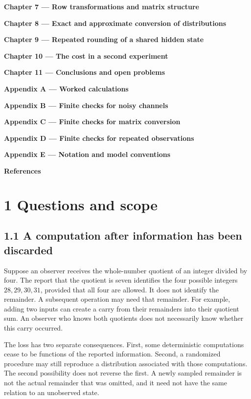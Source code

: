 \documentclass[
]{article}
\begin{document}
\textbf{Chapter 7 --- Row transformations and matrix structure}

\textbf{Chapter 8 --- Exact and approximate conversion of distributions}

\textbf{Chapter 9 --- Repeated rounding of a shared hidden state}

\textbf{Chapter 10 --- The cost in a second experiment}

\textbf{Chapter 11 --- Conclusions and open problems}

\textbf{Appendix A --- Worked calculations}

\textbf{Appendix B --- Finite checks for noisy channels}

\textbf{Appendix C --- Finite checks for matrix conversion}

\textbf{Appendix D --- Finite checks for repeated observations}

\textbf{Appendix E --- Notation and model conventions}

\textbf{References}

\section{1 Questions and scope}\label{questions-and-scope}

\subsection{1.1 A computation after information has been
discarded}\label{a-computation-after-information-has-been-discarded}

Suppose an observer receives the whole-number quotient of an integer
divided by four. The report that the quotient is seven identifies the
four possible integers \(28,29,30,31\), provided that all four are
allowed. It does not identify the remainder. A subsequent operation may
need that remainder. For example, adding two inputs can create a carry
from their remainders into their quotient sum. An observer who knows
both quotients does not necessarily know whether this carry occurred.

The loss has two separate consequences. First, some deterministic
computations cease to be functions of the reported information. Second,
a randomized procedure may still reproduce a distribution associated
with those computations. The second possibility does not reverse the
first. A newly sampled remainder is not the actual remainder that was
omitted, and it need not have the same relation to an unobserved state.
\end{document}
